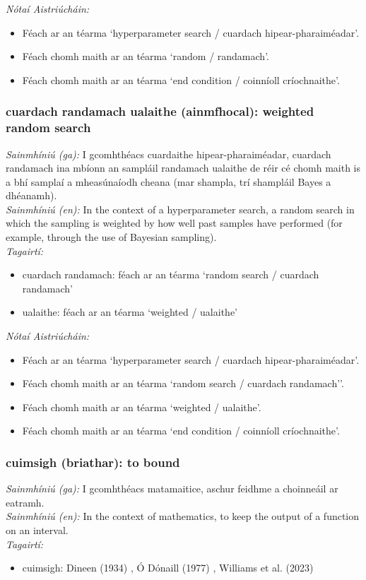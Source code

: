  \noindent \textit{Nótaí Aistriúcháin:}
\begin{itemize}
	\item Féach ar an téarma `hyperparameter search / cuardach hipear-pharaiméadar'.
	\item Féach chomh maith ar an téarma `random / randamach'.
	\item Féach chomh maith ar an téarma `end condition / coinníoll críochnaithe'.
\end{itemize}


\subsubsection*{cuardach randamach ualaithe (ainmfhocal): weighted random search}
 \noindent \textit{Sainmhíniú (ga):} I gcomhthéacs cuardaithe hipear-pharaiméadar, cuardach randamach ina mbíonn an sampláil randamach ualaithe de réir cé chomh maith is a bhí samplaí a mheasúnaíodh cheana (mar shampla, trí shampláil Bayes a dhéanamh).
\\
 \noindent \textit{Sainmhíniú (en):} In the context of a hyperparameter search, a random search in which the sampling is weighted by how well past samples have performed (for example, through the use of Bayesian sampling).
\\
 \noindent \textit{Tagairtí:}
\begin{itemize}
	\item cuardach randamach: féach ar an téarma `random search / cuardach randamach'
	\item ualaithe: féach ar an téarma `weighted / ualaithe'
\end{itemize}

 \noindent \textit{Nótaí Aistriúcháin:}
\begin{itemize}
	\item Féach ar an téarma `hyperparameter search / cuardach hipear-pharaiméadar'.
	\item Féach chomh maith ar an téarma `random search / cuardach randamach''.
	\item Féach chomh maith ar an téarma `weighted / ualaithe'.
	\item Féach chomh maith ar an téarma `end condition / coinníoll críochnaithe'.
\end{itemize}


\subsubsection*{cuimsigh (briathar): to bound}
 \noindent \textit{Sainmhíniú (ga):} I gcomhthéacs matamaitice, aschur feidhme a choinneáil ar eatramh.
\\
 \noindent \textit{Sainmhíniú (en):} In the context of mathematics, to keep the output of a function on an interval.
\\
 \noindent \textit{Tagairtí:}
\begin{itemize}
	\item cuimsigh: Dineen (1934) \cite{dineen}, Ó Dónaill (1977) \cite{odonaill}, Williams et al. (2023) \cite{storchiste}
\end{itemize}

